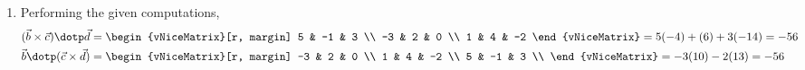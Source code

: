 \begin{enumerate}
    \item Performing the given computations,
          \begin{align}
              (\vec{b} \times \vec{c}) \dotp \vec{d} & =
              \begin{vNiceMatrix}[r, margin]
                  5  & -1 & 3  \\
                  -3 & 2  & 0  \\
                  1  & 4  & -2
              \end{vNiceMatrix} = 5(-4) + (6) + 3(-14) = -56 \\
              \vec{b} \dotp (\vec{c} \times \vec{d}) & =
              \begin{vNiceMatrix}[r, margin]
                  -3 & 2  & 0  \\
                  1  & 4  & -2 \\
                  5  & -1 & 3  \\
              \end{vNiceMatrix} = -3(10) - 2(13) = -56
          \end{align}


\end{enumerate}
